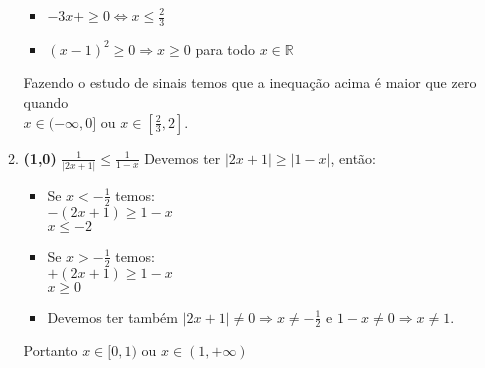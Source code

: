 \documentclass[a4paper,12pt]{article}
\newcommand{\ds}{\displaystyle}
\begin{document}
\begin{enumerate}
\begin{enumerate}
\begin{itemize}
   \item $-3x+\geq0 \Leftrightarrow x\leq\frac{2}{3}$\\
   \item $(x-1)^2\geq0 \Rightarrow x\geq 0$ para todo $x\in\mathbb{R}$\\
  \end{itemize}
 Fazendo o estudo de sinais temos que a inequação acima é maior que zero quando\\ $x\in(-\infty,0]$ ou $x\in[\frac{2}{3},2]$.\\
\item {\bf (1,0)} $\ds \frac{1}{|2x+1|}\leq  \frac{1}{1-x}  $
Devemos ter $|2x+1|\geq|1-x|$, então:
  \begin{itemize}
  \item Se $x<-\frac{1}{2}$ temos:\\
  $-(2x+1)\geq1-x$\\
  $x\leq-2$\\
  \item Se $x>-\frac{1}{2}$ temos:\\
  $+(2x+1)\geq1-x$\\
  $x\geq0$\\
  \item Devemos ter também $|2x+1|\neq0 \Rightarrow x\neq-\frac{1}{2}$ e $1-x\neq0 \Rightarrow x\neq 1$.
  \end{itemize}
  Portanto $x\in[0,1)$ ou $x\in(1,+\infty)$\\


\end{enumerate}
\end{enumerate}
\end{document}
